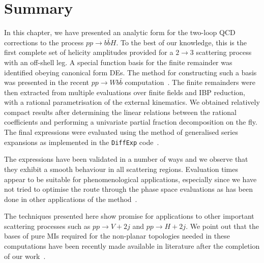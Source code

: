 \documentclass[main.tex]{subfiles}
\begin{document}
\section{Summary}
\label{Hbbsec:conclusions}

In this chapter, we have presented an analytic form for the two-loop QCD corrections to the process
$pp\to b\bar{b}H$. To the best of our knowledge, this is the first complete set of helicity
amplitudes provided for a $2\to 3$ scattering process with an off-shell leg. A special function basis for
the finite remainder was identified obeying canonical form DEs. The method for
constructing such a basis was presented in the recent $pp\to Wb\bar{b}$ computation~\cite{Badger:2021nhg}. The finite remainders were then extracted from multiple
evaluations over finite fields and IBP reduction, with a rational parametrisation of the external kinematics.
We obtained relatively compact results after determining the linear relations between the rational coefficients and
performing a univariate partial fraction decomposition on the fly. The final expressions were evaluated using the method of generalised series expansions as implemented in the \texttt{DiffExp} code~\cite{Hidding:2020ytt}.

The expressions have been validated in a number of ways and we observe that they exhibit a smooth behaviour in all
scattering regions. Evaluation times appear to be suitable for phenomenological applications,
especially since we have not tried to optimise the route through the phase space evaluations as has
been done in other applications of the method~\cite{Frellesvig:2019byn,Abreu:2020jxa,Becchetti:2020wof,Bonciani:2021zzf,abreu2021twoloop}.

The techniques presented here show promise for applications to other important scattering processes such as $pp\to V+2j$ and $pp\to H+2j$. We point out that the bases of pure MIs required for the non-planar topologies needed in these computations have been recently made available in literature after the completion of our work~\cite{Abreu:2023rco}.
\end{document}
